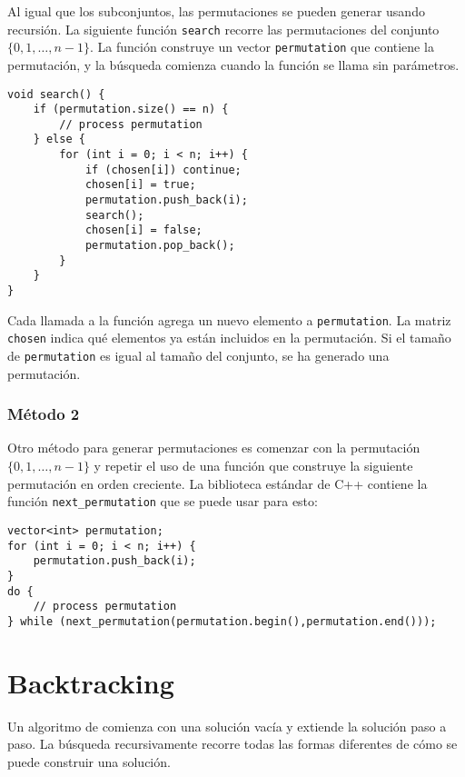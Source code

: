 Al igual que los subconjuntos, las permutaciones se pueden generar
usando recursión.
La siguiente función \texttt{search}
recorre las permutaciones del conjunto $\{0,1,\ldots,n-1\}$.
La función construye un vector \texttt{permutation}
que contiene la permutación,
y la búsqueda comienza cuando la función se
llama sin parámetros.

\begin{lstlisting}
void search() {
    if (permutation.size() == n) {
        // process permutation
    } else {
        for (int i = 0; i < n; i++) {
            if (chosen[i]) continue;
            chosen[i] = true;
            permutation.push_back(i);
            search();
            chosen[i] = false;
            permutation.pop_back();
        }
    }
}
\end{lstlisting}

Cada llamada a la función agrega un nuevo elemento a
\texttt{permutation}.
La matriz \texttt{chosen} indica qué
elementos ya están incluidos en la permutación.
Si el tamaño de \texttt{permutation} es igual al tamaño del conjunto,
se ha generado una permutación.

\subsubsection{Método 2}


Otro método para generar permutaciones
es comenzar con la permutación
$\{0,1,\ldots,n-1\}$ y repetir
el uso de una función que construye la siguiente permutación
en orden creciente.
La biblioteca estándar de C++ contiene la función
\texttt{next\_permutation} que se puede usar para esto:

\begin{lstlisting}
vector<int> permutation;
for (int i = 0; i < n; i++) {
    permutation.push_back(i);
}
do {
    // process permutation
} while (next_permutation(permutation.begin(),permutation.end()));
\end{lstlisting}

\section{Backtracking}


Un algoritmo de 
comienza con una solución vacía
y extiende la solución paso a paso.
La búsqueda recursivamente
recorre todas las formas diferentes de cómo
se puede construir una solución.

